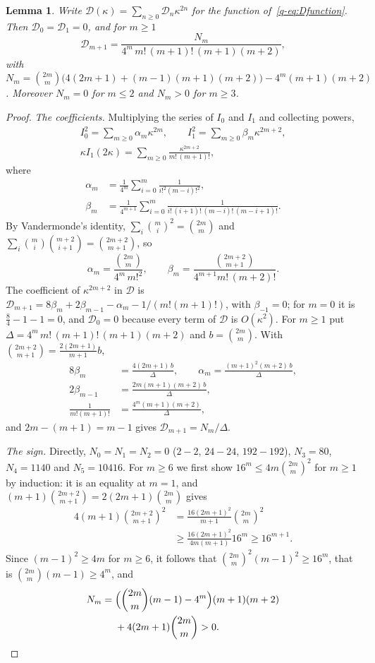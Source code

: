\documentclass[11pt]{amsart}
\newtheorem{lemma}[theorem]{Lemma}
\theoremstyle{definition}
\theoremstyle{remark}
\numberwithin{equation}{section}
\begin{document}
\begin{lemma}\label{q-lem:Dcoef}
Write $\mathcal D(\kappa)=\sum_{n\ge0}\mathcal D_n\kappa^{2n}$ for the function
of~\eqref{q-eq:Dfunction}. Then $\mathcal D_0=\mathcal D_1=0$, and for $m\ge1$
\[
\mathcal D_{m+1}=\frac{N_m}{4^m\,m!\,(m+1)!\,(m+1)(m+2)},
\]
with $N_m=\binom{2m}m\bigl(4(2m+1)+(m-1)(m+1)(m+2)\bigr)-4^m(m+1)(m+2)$.
Moreover $N_m=0$ for $m\le2$ and $N_m>0$ for $m\ge3$.
\end{lemma}

\begin{proof}
\emph{The coefficients.} Multiplying the series of $I_0$ and $I_1$ and
collecting powers,
\[
\begin{gathered}
I_0^2=\sum_{m\ge0}\alpha_m\kappa^{2m},\qquad I_1^2=\sum_{m\ge0}\beta_m
\kappa^{2m+2},\\
\kappa I_1(2\kappa)=\sum_{m\ge0}\frac{\kappa^{2m+2}}{m!\,(m+1)!},
\end{gathered}
\]
where
\[
\begin{aligned}
\alpha_m&=\frac1{4^m}\sum_{i=0}^m\frac1{i!^2(m-i)!^2},\\
\beta_m&=\frac1{4^{m+1}}\sum_{i=0}^m\frac1{i!\,(i+1)!\,(m-i)!\,(m-i+1)!}.
\end{aligned}
\]
By Vandermonde's identity, $\sum_i\binom mi^2=\binom{2m}m$ and
$\sum_i\binom mi\binom{m+2}{i+1}=\binom{2m+2}{m+1}$, so
\[
\alpha_m=\frac{\binom{2m}m}{4^m\,m!^2},\qquad\beta_m=\frac{\binom{2m+2}{m+1}}
{4^{m+1}m!\,(m+2)!}.
\]
The coefficient of $\kappa^{2m+2}$ in $\mathcal D$ is $\mathcal D_{m+1}=8\beta_m
+2\beta_{m-1}-\alpha_m-1/(m!(m+1)!)$, with $\beta_{-1}=0$; for $m=0$ it is
$\frac84-1-1=0$, and $\mathcal D_0=0$ because every term of $\mathcal D$ is
$O(\kappa^2)$. For $m\ge1$ put $\Delta=4^m\,m!\,(m+1)!\,(m+1)(m+2)$ and
$b=\binom{2m}m$. With $\binom{2m+2}{m+1}=\frac{2(2m+1)}{m+1}b$,
\[
\begin{aligned}
8\beta_m&=\frac{4(2m+1)\,b}\Delta,\qquad\alpha_m=\frac{(m+1)^2(m+2)\,b}\Delta,\\
2\beta_{m-1}&=\frac{2m(m+1)(m+2)\,b}\Delta,\\
\frac1{m!(m+1)!}&=\frac{4^m(m+1)(m+2)}\Delta,
\end{aligned}
\]
and $2m-(m+1)=m-1$ gives $\mathcal D_{m+1}=N_m/\Delta$.

\emph{The sign.} Directly, $N_0=N_1=N_2=0$ ($2-2$, $24-24$, $192-192$),
$N_3=80$, $N_4=1140$ and $N_5=10416$. For $m\ge6$ we first show
$16^m\le4m\binom{2m}m^2$ for $m\ge1$ by induction: it is an equality at
$m=1$, and $(m+1)\binom{2m+2}{m+1}=2(2m+1)\binom{2m}m$ gives
\[
\begin{aligned}
4(m+1)\binom{2m+2}{m+1}^2&=\frac{16(2m+1)^2}{m+1}\binom{2m}m^2\\
&\ge\frac{16(2m+1)^2}{4m(m+1)}16^m\ge16^{m+1}.
\end{aligned}
\]
Since $(m-1)^2\ge4m$ for $m\ge6$, it follows that $\binom{2m}m^2(m-1)^2\ge
16^m$, that is $\binom{2m}m(m-1)\ge4^m$, and
\[
\begin{aligned}
N_m={}&\Bigl(\binom{2m}m(m-1)-4^m\Bigr)(m+1)(m+2)\\
&+4(2m+1)\binom{2m}m>0 .
\end{aligned}
\]
\end{proof}
\end{document}
